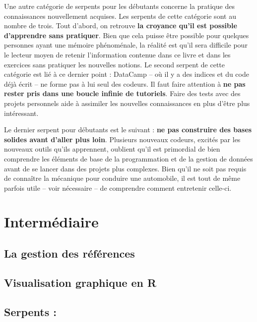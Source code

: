 \documentclass[
  letterpaper,
]{scrbook}
\begin{document}
Une autre catégorie de serpents pour les débutants concerne la pratique
des connaissances nouvellement acquises. Les serpents de cette catégorie
sont au nombre de trois. Tout d'abord, on retrouve \textbf{la croyance
qu'il est possible d'apprendre sans pratiquer}. Bien que cela puisse
être possible pour quelques personnes ayant une mémoire phénoménale, la
réalité est qu'il sera difficile pour le lecteur moyen de retenir
l'information contenue dans ce livre et dans les exercices sans
pratiquer les nouvelles notions. Le second serpent de cette catégorie
est lié à ce dernier point : DataCamp -- où il y a des indices et du
code déjà écrit -- ne forme pas à lui seul des codeurs. Il faut faire
attention à \textbf{ne pas rester pris dans une boucle infinie de
tutoriels}. Faire des tests avec des projets personnels aide à assimiler
les nouvelles connaissances en plus d'être plus intéressant.

Le dernier serpent pour débutants est le suivant : \textbf{ne pas
construire des bases solides avant d'aller plus loin}. Plusieurs
nouveaux codeurs, excités par les nouveaux outils qu'ils apprennent,
oublient qu'il est primordial de bien comprendre les éléments de base de
la programmation et de la gestion de données avant de se lancer dans des
projets plus complexes. Bien qu'il ne soit pas requis de connaître la
mécanique pour conduire une automobile, il est tout de même parfois
utile -- voir nécessaire -- de comprendre comment entretenir celle-ci.

\hypertarget{intermuxe9diaire}{%
\section{Intermédiaire}\label{intermuxe9diaire}}

\hypertarget{la-gestion-des-ruxe9fuxe9rences}{%
\subsection{La gestion des
références}\label{la-gestion-des-ruxe9fuxe9rences}}

\hypertarget{visualisation-graphique-en-r}{%
\subsection{Visualisation graphique en
R}\label{visualisation-graphique-en-r}}

\hypertarget{serpents-1}{%
\subsection{Serpents :}\label{serpents-1}}
\end{document}
